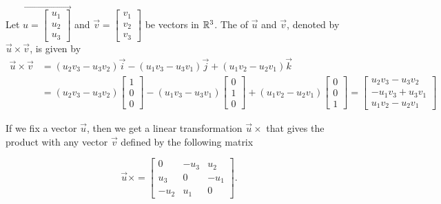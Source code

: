 \documentclass{ximera}
\begin{document}
\begin{definition}\label{def:crossproduct} Let $\vec{u=\begin{bmatrix}u_1\\u_2\\u_3\end{bmatrix}}$ and $\vec{v}=\begin{bmatrix}v_1\\v_2\\v_3\end{bmatrix}$ be vectors in $\mathbb{R}^3$.  The  of $\vec{u}$ and $\vec{v}$, denoted by $\vec{u}\times\vec{v}$, is given by
\begin{align*}
\vec{u}\times\vec{v}&=(u_2v_3-u_3v_2)\vec{i}-(u_1v_3-u_3v_1)\vec{j}+(u_1v_2-u_2v_1)\vec{k} \\
&=(u_2v_3-u_3v_2)\begin{bmatrix}1\\0\\0\end{bmatrix}-(u_1v_3-u_3v_1)\begin{bmatrix}0\\1\\0\end{bmatrix}+(u_1v_2-u_2v_1)\begin{bmatrix}0\\0\\1\end{bmatrix}=\begin{bmatrix}u_2v_3-u_3v_2\\-u_1v_3+u_3v_1\\u_1v_2-u_2v_1\end{bmatrix}
\end{align*}

If we fix a vector $\vec{u}$, then we get a linear transformation $\vec{u}\times$ that gives the product with any vector $\vec{v}$ defined by the following matrix

$$\vec{u}\times=\begin{bmatrix}
  0 &-u_3& u_2\\u_3 &0 &-u_1\\-u_2 &u_1 &0
\end{bmatrix}.$$
\end{definition}
\end{document}
